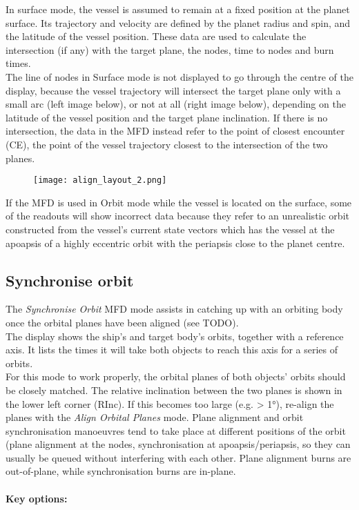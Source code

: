 \documentclass[Orbiter User Manual.tex]{subfiles}
\begin{document}
\noindent
In surface mode, the vessel is assumed to remain at a fixed position at the planet surface. Its trajectory and velocity are defined by the planet radius and spin, and the latitude of the vessel position. These data are used to calculate the intersection (if any) with the target plane, the nodes, time to nodes and burn times.\\
The line of nodes in Surface mode is not displayed to go through the centre of the display, because the vessel trajectory will intersect the target plane only with a small arc (left image below), or not at all (right image below), depending on the latitude of the vessel position and the target plane inclination. If there is no intersection, the data in the MFD instead refer to the point of closest encounter (CE), the point of the vessel trajectory closest to the intersection of the two planes.

\begin{figure}[H]
  \centering
  \texttt{[image: align\_layout\_2.png]}
\end{figure}

\noindent
If the MFD is used in Orbit mode while the vessel is located on the surface, some of the readouts will show incorrect data because they refer to an unrealistic orbit constructed from the vessel's current state vectors which has the vessel at the apoapsis of a highly eccentric orbit with the periapsis close to the planet centre.


\subsection{Synchronise orbit}
The \textit{Synchronise Orbit} MFD mode assists in catching up with an orbiting body once the orbital planes have been aligned (see TODO).\\
The display shows the ship's and target body's orbits, together with a reference axis. It lists the times it will take both objects to reach this axis for a series of orbits.\\
For this mode to work properly, the orbital planes of both objects' orbits should be closely matched. The relative inclination between the two planes is shown in the lower left corner (RInc). If this becomes too large (e.g. > 1°), re-align the planes with the \textit{Align Orbital Planes} mode. Plane alignment and orbit synchronisation manoeuvres tend to take place at different positions of the orbit (plane alignment at the nodes, synchronisation at apoapsis/periapsis, so they can usually be queued without interfering with each other. Plane alignment burns are out-of-plane, while synchronisation burns are in-plane.\\
\\
\textbf{Key options:}
\end{document}

